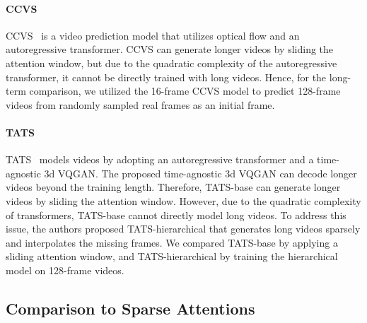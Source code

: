 \documentclass[10pt,twocolumn,letterpaper]{article}
\begin{document}
\paragraph{CCVS}
CCVS~\cite{CCVS} is a video prediction model that utilizes optical flow and an autoregressive transformer. CCVS can generate longer videos by sliding the attention window, but due to the quadratic complexity of the autoregressive transformer, it cannot be directly trained with long videos.
Hence, for the long-term comparison, we utilized the 16-frame CCVS model to predict 128-frame videos from randomly sampled real frames as an initial frame.

\paragraph{TATS}
TATS~\cite{TATS} models videos by adopting an autoregressive transformer and a time-agnostic 3d VQGAN. The proposed time-agnostic 3d VQGAN can decode longer videos beyond the training length. Therefore, TATS-base can generate longer videos by sliding the attention window. However, due to the quadratic complexity of transformers, TATS-base cannot directly model long videos. To address this issue, the authors proposed TATS-hierarchical that generates long videos sparsely and interpolates the missing frames. We compared TATS-base by applying a sliding attention window, and TATS-hierarchical by training the hierarchical model on 128-frame videos.

\subsection{Comparison to Sparse Attentions}
\label{appx:asymptotic_mem}
\iffalse
To compare the asymptotic memory complexity of sparse attention methods used in Section {\color{red}5.4} with MeBT, let's denote  and  as the number of tokens in spatial and temporal dimensions, respectively. Then,
\begin{enumerate}
    \item {\bf Axial attention}~\cite{Ho2019} alternates attention over horizontal, vertical, and temporal axes. 
    The queries in each attention layer can only interact with tokens on the same axis. 
    The overall complexity is .
    \item {\bf Window attention}~\cite{MaskViT} alternates attention over spatial and temporal axes. It performs frame-wise attention over  tokens followed by spatio-temporal attention over  tokens where  is the size of spatial window. 
    The complexity is .
\end{enumerate}
While these methods are asymptotically more efficient than dense attention of , they still have quadratic complexity with respect to the spatial () or temporal dimension (). It is important to note that MeBT with  latent codes has a linear complexity of  for both  and .
\fi
\end{document}
